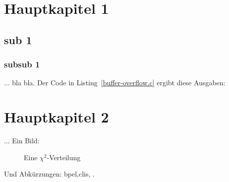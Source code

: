 \section{Hauptkapitel 1}
\subsection{sub 1}
\subsubsection{subsub 1}
... bla bla. Der Code in Listing~\ref{buffer-overflow.c} ergibt diese Ausgaben:

\section{Hauptkapitel 2}
... Ein Bild:

\begin{figure}[h]
  \caption{Eine $\chi^2$-Verteilung}\label{img-sample}
\end{figure}

Und Abkürzungen: \gls{bpel},\glspl{cli}, .
